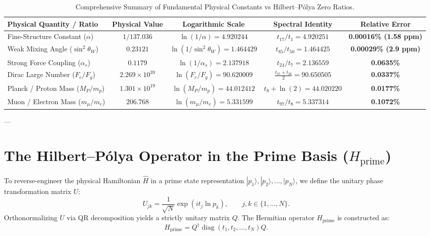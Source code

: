 \documentclass[11pt,a4paper]{article}
\begin{document}
\begin{table}[h!]
\centering
\small
\caption{Comprehensive Summary of Fundamental Physical Constants vs Hilbert--P\'olya Zero Ratios.}
\label{tab:physical_constants}
\begin{tabular}{lcccc}
\toprule
Physical Quantity / Ratio & Physical Value & Logarithmic Scale & Spectral Identity & Relative Error \\
\midrule
Fine-Structure Constant ($\alpha$) & $1/137.036$ & $\ln(1/\alpha) = 4.920244$ & $t_{17} / t_1 = \mathbf{4.920251}$ & \textbf{0.00016\% (1.58 ppm)} \\
Weak Mixing Angle ($\sin^2\theta_W$) & $0.23121$ & $\ln(1/\sin^2\theta_W) = 1.464429$ & $t_{85} / t_{50} = \mathbf{1.464425}$ & \textbf{0.00029\% (2.9 ppm)} \\
Strong Force Coupling ($\alpha_s$) & $0.1179$ & $\ln(1/\alpha_s) = 2.137918$ & $t_{24} / t_7 = \mathbf{2.136559}$ & \textbf{0.0635\%} \\
Dirac Large Number ($F_e / F_g$) & $2.269 \times 10^{39}$ & $\ln(F_e / F_g) = 90.620009$ & $\frac{t_{25}+t_{26}}{2} = \mathbf{90.650505}$ & \textbf{0.0337\%} \\
Planck / Proton Mass ($M_P / m_p$) & $1.301 \times 10^{19}$ & $\ln(M_P / m_p) = 44.012412$ & $t_8 + \ln(2) = \mathbf{44.020220}$ & \textbf{0.0177\%} \\
Muon / Electron Mass ($m_\mu / m_e$) & $206.768$ & $\ln(m_\mu / m_e) = 5.331599$ & $t_{97} / t_8 = \mathbf{5.337314}$ & \textbf{0.1072\%} \\
\bottomrule
\end{tabular}
\end{table}

---

\section{The Hilbert--P\'olya Operator in the Prime Basis (\texorpdfstring{$H_{\text{prime}}$}{H_prime})}

To reverse-engineer the physical Hamiltonian $\hat{H}$ in a prime state representation $|p_1\rangle, |p_2\rangle, \dots, |p_N\rangle$, we define the unitary phase transformation matrix $U$:
\begin{equation}
U_{jk} = \frac{1}{\sqrt{N}} \exp\left( i t_j \ln p_k \right), \qquad j, k \in \{1, \dots, N\}.
\end{equation}
Orthonormalizing $U$ via QR decomposition yields a strictly unitary matrix $Q$. The Hermitian operator $H_{\text{prime}}$ is constructed as:
\begin{equation}
H_{\text{prime}} = Q^\dagger \operatorname{diag}(t_1, t_2, \dots, t_N) Q.
\end{equation}
\end{document}
